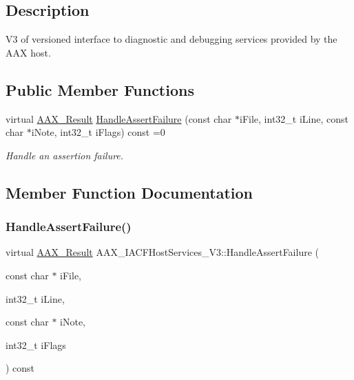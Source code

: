 \subsection{Description}
V3 of versioned interface to diagnostic and debugging services provided by the A\+AX host. \subsection*{Public Member Functions}
\begin{DoxyCompactItemize}
\item 
virtual \mbox{\hyperlink{a00392_a4d8f69a697df7f70c3a8e9b8ee130d2f}{A\+A\+X\+\_\+\+Result}} \mbox{\hyperlink{a01721_aaaddbd89dd3d6dd2e9e9def5b99c579f}{Handle\+Assert\+Failure}} (const char $\ast$i\+File, int32\+\_\+t i\+Line, const char $\ast$i\+Note, int32\+\_\+t i\+Flags) const =0
\begin{DoxyCompactList}\small\item\em Handle an assertion failure. \end{DoxyCompactList}\end{DoxyCompactItemize}


\subsection{Member Function Documentation}
\mbox{\label{a01721_aaaddbd89dd3d6dd2e9e9def5b99c579f}} 
\subsubsection{\texorpdfstring{HandleAssertFailure()}{HandleAssertFailure()}}
{\footnotesize\ttfamily virtual \mbox{\hyperlink{a00392_a4d8f69a697df7f70c3a8e9b8ee130d2f}{A\+A\+X\+\_\+\+Result}} A\+A\+X\+\_\+\+I\+A\+C\+F\+Host\+Services\+\_\+\+V3\+::\+Handle\+Assert\+Failure (\begin{DoxyParamCaption}\item[{const char $\ast$}]{i\+File,  }\item[{int32\+\_\+t}]{i\+Line,  }\item[{const char $\ast$}]{i\+Note,  }\item[{int32\+\_\+t}]{i\+Flags }\end{DoxyParamCaption}) const\hspace{0.3cm}{\ttfamily [pure virtual]}}



